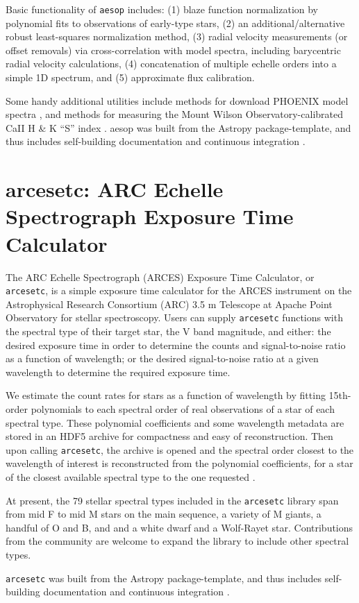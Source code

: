 \documentclass[12pt, twoside]{uwthesis}
\begin{document}
Basic functionality of {\tt aesop} includes: (1) blaze function normalization by polynomial fits to observations of early-type stars, (2) an additional/alternative robust least-squares normalization method, (3) radial velocity measurements (or offset removals) via cross-correlation with model spectra, including barycentric radial velocity calculations, (4) concatenation of multiple echelle orders into a simple 1D spectrum, and (5) approximate flux calibration.

Some handy additional utilities include methods for download PHOENIX model spectra \citep{Husser2013}, and methods for measuring the Mount Wilson Observatory-calibrated CaII H & K ``S'' index \citep{Morris2017b}. aesop was built from the Astropy package-template, and thus includes self-building documentation and continuous integration \citep{Astropy2018}.
 
 \chapter{arcesetc: ARC Echelle Spectrograph Exposure Time Calculator}
 
The ARC Echelle Spectrograph (ARCES) Exposure Time Calculator, or {\tt arcesetc}, is a simple exposure time calculator for the ARCES instrument on the Astrophysical Research Consortium (ARC) 3.5 m Telescope at Apache Point Observatory for stellar spectroscopy. Users can supply {\tt arcesetc} functions with the spectral type of their target star, the V band magnitude, and either: the desired exposure time in order to determine the counts and signal-to-noise ratio as a function of wavelength; or the desired signal-to-noise ratio at a given wavelength to determine the required exposure time.

We estimate the count rates for stars as a function of wavelength by fitting 15th-order polynomials to each spectral order of real observations of a star of each spectral type. These polynomial coefficients and some wavelength metadata are stored in an HDF5 archive for compactness and easy of reconstruction. Then upon calling {\tt arcesetc}, the archive is opened and the spectral order closest to the wavelength of interest is reconstructed from the polynomial coefficients, for a star of the closest available spectral type to the one requested .

At present, the 79 stellar spectral types included in the {\tt arcesetc} library span from mid F to mid M stars on the main sequence, a variety of M giants, a handful of O and B, and and a white dwarf and a Wolf-Rayet star. Contributions from the community are welcome to expand the library to include other spectral
types.

{\tt arcesetc} was built from the Astropy package-template, and thus includes self-building documentation and continuous integration \citep{Astropy2018}.
 

\end{document}
